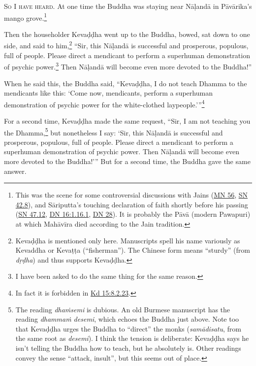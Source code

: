 \documentclass[12pt,openany]{book}%
\newcommand*{\langlzh}[1]{\cjk{#1}\normalfont}%
\newcommand*{\scevam}[1]{\textsc{#1}}
\begin{document}
\scevam{So I have heard. }At one time the Buddha was staying near \textsanskrit{Nāḷandā} in \textsanskrit{Pāvārika}’s mango grove.\footnote{This was the scene for some controversial discussions with Jains (\href{https://suttacentral.net/mn56/en/sujato}{MN 56}, \href{https://suttacentral.net/sn42.8/en/sujato}{SN 42.8}), and \textsanskrit{Sāriputta}’s touching declaration of faith shortly before his passing (\href{https://suttacentral.net/sn47.12/en/sujato}{SN 47.12}, \href{https://suttacentral.net/dn16/en/sujato\#1.16.1}{DN 16:1.16.1}, \href{https://suttacentral.net/dn28/en/sujato}{DN 28}). It is probably the \textsanskrit{Pāvā} (modern Pawapuri) at which \textsanskrit{Mahāvīra} died according to the Jain tradition. } 

Then the householder \textsanskrit{Kevaḍḍha} went up to the Buddha, bowed, sat down to one side, and said to him,\footnote{\textsanskrit{Kevaḍḍha} is mentioned only here. Manuscripts spell his name variously as Kevaddha or \textsanskrit{Kevaṭṭa} (“fisherman”). The Chinese form \langlzh{堅固} means “sturdy” (from \textit{\textsanskrit{dṛḍha}}) and thus supports \textsanskrit{Kevaḍḍha}. } “Sir, this \textsanskrit{Nāḷandā} is successful and prosperous, populous, full of people. Please direct a mendicant to perform a superhuman demonstration of psychic power.\footnote{I have been asked to do the same thing for the same reason. } Then \textsanskrit{Nāḷandā} will become even more devoted to the Buddha!” 

When he said this, the Buddha said, “\textsanskrit{Kevaḍḍha}, I do not teach Dhamma to the mendicants like this: ‘Come now, mendicants, perform a superhuman demonstration of psychic power for the white-clothed laypeople.’”\footnote{In fact it is forbidden in \href{https://suttacentral.net/pli-tv-kd15/en/sujato\#8.2.23}{Kd 15:8.2.23}. } 

For a second time, \textsanskrit{Kevaḍḍha} made the same request, “Sir, I am not teaching you the Dhamma,\footnote{The reading \textit{\textsanskrit{dhaṁsemi}} is dubious. An old Burmese manuscript has the reading \textit{\textsanskrit{dhammaṁ} desemi}, which echoes the Buddha just above. Note too that \textsanskrit{Kevaḍḍha} urges the Buddha to “direct” the monks (\textit{\textsanskrit{samādisatu}}, from the same root as \textit{desemi}). I think the tension is deliberate: \textsanskrit{Kevaḍḍha} says he isn’t telling the Buddha how to teach, but he absolutely is. Other readings convey the sense “attack, insult”, but this seems out of place. } but nonetheless I say: ‘Sir, this \textsanskrit{Nāḷandā} is successful and prosperous, populous, full of people. Please direct a mendicant to perform a superhuman demonstration of psychic power. Then \textsanskrit{Nāḷandā} will become even more devoted to the Buddha!’” But for a second time, the Buddha gave the same answer. 
\end{document}
